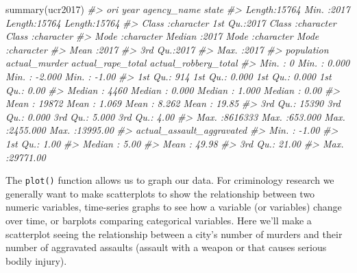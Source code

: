 \documentclass[
  12pt,
]{book}
\newenvironment{Shaded}{\begin{snugshade}}{\end{snugshade}}
\newcommand{\CommentTok}[1]{\textcolor[rgb]{0.37,0.37,0.37}{\textit{#1}}}
\newcommand{\FunctionTok}[1]{\textcolor[rgb]{0,0,0}{#1}}
\newcommand{\NormalTok}[1]{#1}
\begin{document}
\begin{Shaded}
\begin{Highlighting}[]
\FunctionTok{summary}\NormalTok{(ucr2017)}
\CommentTok{\#\textgreater{}      ori                 year      agency\_name           state          }
\CommentTok{\#\textgreater{}  Length:15764       Min.   :2017   Length:15764       Length:15764      }
\CommentTok{\#\textgreater{}  Class :character   1st Qu.:2017   Class :character   Class :character  }
\CommentTok{\#\textgreater{}  Mode  :character   Median :2017   Mode  :character   Mode  :character  }
\CommentTok{\#\textgreater{}                     Mean   :2017                                        }
\CommentTok{\#\textgreater{}                     3rd Qu.:2017                                        }
\CommentTok{\#\textgreater{}                     Max.   :2017                                        }
\CommentTok{\#\textgreater{}    population      actual\_murder     actual\_rape\_total  actual\_robbery\_total}
\CommentTok{\#\textgreater{}  Min.   :      0   Min.   :  0.000   Min.   :  {-}2.000   Min.   :   {-}1.00    }
\CommentTok{\#\textgreater{}  1st Qu.:    914   1st Qu.:  0.000   1st Qu.:   0.000   1st Qu.:    0.00    }
\CommentTok{\#\textgreater{}  Median :   4460   Median :  0.000   Median :   1.000   Median :    0.00    }
\CommentTok{\#\textgreater{}  Mean   :  19872   Mean   :  1.069   Mean   :   8.262   Mean   :   19.85    }
\CommentTok{\#\textgreater{}  3rd Qu.:  15390   3rd Qu.:  0.000   3rd Qu.:   5.000   3rd Qu.:    4.00    }
\CommentTok{\#\textgreater{}  Max.   :8616333   Max.   :653.000   Max.   :2455.000   Max.   :13995.00    }
\CommentTok{\#\textgreater{}  actual\_assault\_aggravated}
\CommentTok{\#\textgreater{}  Min.   :   {-}1.00         }
\CommentTok{\#\textgreater{}  1st Qu.:    1.00         }
\CommentTok{\#\textgreater{}  Median :    5.00         }
\CommentTok{\#\textgreater{}  Mean   :   49.98         }
\CommentTok{\#\textgreater{}  3rd Qu.:   21.00         }
\CommentTok{\#\textgreater{}  Max.   :29771.00}
\end{Highlighting}
\end{Shaded}

The \texttt{plot()} function allows us to graph our data. For criminology research we generally want to make scatterplots to show the relationship between two numeric variables, time-series graphs to see how a variable (or variables) change over time, or barplots comparing categorical variables. Here we'll make a scatterplot seeing the relationship between a city's number of murders and their number of aggravated assaults (assault with a weapon or that causes serious bodily injury).
\end{document}
